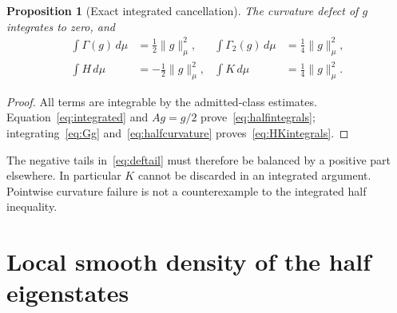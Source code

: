 \documentclass[11pt,a4paper]{article}
\numberwithin{equation}{section}
\newtheorem{proposition}[theorem]{Proposition}
\theoremstyle{definition}
\theoremstyle{remark}
\newcommand{\norm}[1]{\lVert #1\rVert}
\begin{document}
\begin{proposition}[Exact integrated cancellation]\label{prop:cancellation}
The curvature defect of $g$ integrates to zero, and
\begin{align}
 \int\Gamma(g)\,d\mu&=\tfrac12\norm g_\mu^2,
 &\int\Gamma_2(g)\,d\mu&=\tfrac14\norm g_\mu^2,\label{eq:halfintegrals}\\
 \int H\,d\mu&=-\tfrac12\norm g_\mu^2,
 &\int K\,d\mu&=\tfrac14\norm g_\mu^2.\label{eq:HKintegrals}
\end{align}
\end{proposition}
\begin{proof}
All terms are integrable by the admitted-class estimates. Equation~\eqref{eq:integrated} and $Ag=g/2$ prove~\eqref{eq:halfintegrals}; integrating~\eqref{eq:Gg} and~\eqref{eq:halfcurvature} proves~\eqref{eq:HKintegrals}.
\end{proof}

The negative tails in~\eqref{eq:deftail} must therefore be balanced by a positive part elsewhere. In particular $K$ cannot be discarded in an integrated argument. Pointwise curvature failure is not a counterexample to the integrated half inequality.

\section{Local smooth density of the half eigenstates}\label{sec:density}
\end{document}
